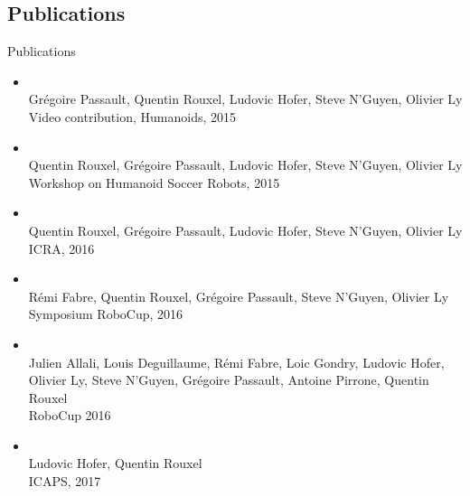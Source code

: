 
\subsection{Publications}

\begin{frame}{Publications}
    \begin{itemize}
        \setlength\itemsep{1.0em}
        \item {}\\
            \scriptsize
            Grégoire Passault, Quentin Rouxel, Ludovic Hofer, Steve N'Guyen, Olivier Ly\\
            Video contribution, Humanoids, 2015\\
        \item {}\\
            \scriptsize
            Quentin Rouxel, Grégoire Passault, Ludovic Hofer, Steve N'Guyen, Olivier Ly\\
            Workshop on Humanoid Soccer Robots, 2015\\
        \item {}\\
            \scriptsize
            Quentin Rouxel, Grégoire Passault, Ludovic Hofer, Steve N'Guyen, Olivier Ly\\
            ICRA, 2016\\
        \item {}\\
            \scriptsize
            Rémi Fabre, Quentin Rouxel, Grégoire Passault, Steve N'Guyen, Olivier Ly\\
            Symposium RoboCup, 2016\\
        \item {}\\
            \scriptsize
            Julien Allali, Louis Deguillaume, Rémi Fabre, Loic Gondry, Ludovic Hofer, Olivier Ly, 
            Steve N'Guyen, Grégoire Passault, Antoine Pirrone, Quentin Rouxel\\
            RoboCup 2016\\
        \item {}\\
            \scriptsize
            Ludovic Hofer, Quentin Rouxel\\
            ICAPS, 2017
    \end{itemize}
\end{frame}

